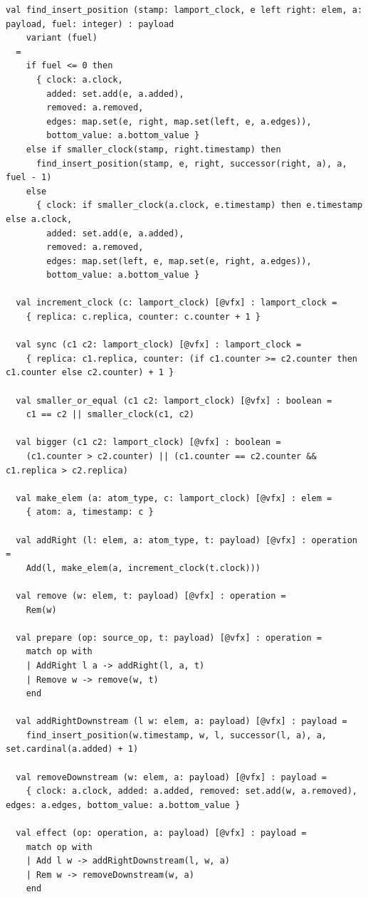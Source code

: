 \begin{lstlisting}[caption={\texttt{RGA}}, label={lst:app_rga}]
  val find_insert_position (stamp: lamport_clock, e left right: elem, a: payload, fuel: integer) : payload
    variant (fuel)
  =
    if fuel <= 0 then
      { clock: a.clock,
        added: set.add(e, a.added),
        removed: a.removed,
        edges: map.set(e, right, map.set(left, e, a.edges)),
        bottom_value: a.bottom_value }
    else if smaller_clock(stamp, right.timestamp) then
      find_insert_position(stamp, e, right, successor(right, a), a, fuel - 1)
    else
      { clock: if smaller_clock(a.clock, e.timestamp) then e.timestamp else a.clock,
        added: set.add(e, a.added),
        removed: a.removed,
        edges: map.set(left, e, map.set(e, right, a.edges)),
        bottom_value: a.bottom_value }

  val increment_clock (c: lamport_clock) [@vfx] : lamport_clock =
    { replica: c.replica, counter: c.counter + 1 }

  val sync (c1 c2: lamport_clock) [@vfx] : lamport_clock =
    { replica: c1.replica, counter: (if c1.counter >= c2.counter then c1.counter else c2.counter) + 1 }

  val smaller_or_equal (c1 c2: lamport_clock) [@vfx] : boolean =
    c1 == c2 || smaller_clock(c1, c2)

  val bigger (c1 c2: lamport_clock) [@vfx] : boolean =
    (c1.counter > c2.counter) || (c1.counter == c2.counter && c1.replica > c2.replica)

  val make_elem (a: atom_type, c: lamport_clock) [@vfx] : elem =
    { atom: a, timestamp: c }

  val addRight (l: elem, a: atom_type, t: payload) [@vfx] : operation =
    Add(l, make_elem(a, increment_clock(t.clock)))

  val remove (w: elem, t: payload) [@vfx] : operation =
    Rem(w)

  val prepare (op: source_op, t: payload) [@vfx] : operation =
    match op with
    | AddRight l a -> addRight(l, a, t)
    | Remove w -> remove(w, t)
    end

  val addRightDownstream (l w: elem, a: payload) [@vfx] : payload =
    find_insert_position(w.timestamp, w, l, successor(l, a), a, set.cardinal(a.added) + 1)

  val removeDownstream (w: elem, a: payload) [@vfx] : payload =
    { clock: a.clock, added: a.added, removed: set.add(w, a.removed), edges: a.edges, bottom_value: a.bottom_value }

  val effect (op: operation, a: payload) [@vfx] : payload =
    match op with
    | Add l w -> addRightDownstream(l, w, a)
    | Rem w -> removeDownstream(w, a)
    end


\end{lstlisting}
